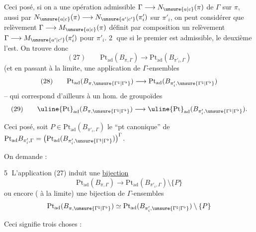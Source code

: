 Ceci posé, si on a une opération  admissible
$\Gamma\longrightarrow N_{\unsure{a|c}}(\pi)$ de $\Gamma$ sur $\pi$,
  aussi par
$N_{\unsure{a|c}}(\pi)\longrightarrow N_{\unsure{a'|c'}}(\pi'_i)$ sur $\pi'_i$,
on peut considérer que  relèvement
$\Gamma\longrightarrow M_{\unsure{a|c}}(\pi)$  définit
par composition un relèvement $\Gamma\longrightarrow M_{\unsure{a'|c'}}(\pi'_i)$
pour $\pi'_i$. 
\textcircled{2} que si le premier est admissible, le deuxième l'est.
On trouve donc
\[
(27)\qquad
\mathrm{Pt}_{\mathrm{ad}}(B_{\pi,\Gamma})
\longrightarrow
\mathrm{Pt}_{\mathrm{ad}}(B_{\pi'_i,\Gamma})
\]
(et en passant à la limite, une application de $\Gamma$-ensembles
\[
(28)\qquad
\mathrm{Pt}_{\mathrm{ad}}(B_{\pi,\unsure{\Gamma^{\natural}|\Gamma^{\flat}}})
\longrightarrow
\mathrm{Pt}_{\mathrm{ad}}(B_{\pi'_i,\unsure{\Gamma^{\natural}|\Gamma^{\flat}}})
\]
-- qui correspond d'ailleurs à un hom. de \unsure{$\Gamma$} groupoïdes
\[
(29)\qquad
\uline{\mathrm{Pt}}_{\mathrm{ad}}(B_{\pi,\unsure{\Gamma^{\natural}|\Gamma^{\flat}}})
\longrightarrow
\uline{\mathrm{Pt}}_{\mathrm{ad}}(B_{\pi'_i,\unsure{\Gamma^{\natural}|\Gamma^{\flat}}}).
\]

Ceci posé, soit $P\in\mathrm{Pt}_{\mathrm{ad}}(B_{\pi'_i,\Gamma})$
le ``pt canonique'' de
$\mathrm{Pt}_{\mathrm{ad}}B_{\pi'_i,\Gamma}
=\bigl(\mathrm{Pt}_{\mathrm{ad}}(B_{\pi'_i,\unsure{\Gamma^{\natural}|\Gamma^{\flat}}})\bigr)^\Gamma$.


On demande :

\textcircled{5} L'application (27) induit une \uline{bijection}
\[
\mathrm{Pt}_{\mathrm{ad}}(B_{\pi,\Gamma})
\longrightarrow
\mathrm{Pt}_{\mathrm{ad}}(B_{\pi'_i,\Gamma})\setminus\{P\}
\]
ou encore ( à la limite) une bijection de $\Gamma$-ensembles
\[
\mathrm{Pt}_{\mathrm{ad}}(B_{\pi,\unsure{\Gamma^{\natural}|\Gamma^{\flat}}})
\simeq
\mathrm{Pt}_{\mathrm{ad}}(B_{\pi'_i,\unsure{\Gamma^{\natural}|\Gamma^{\flat}}})\setminus\{P\}
\]

Ceci signifie trois choses :

